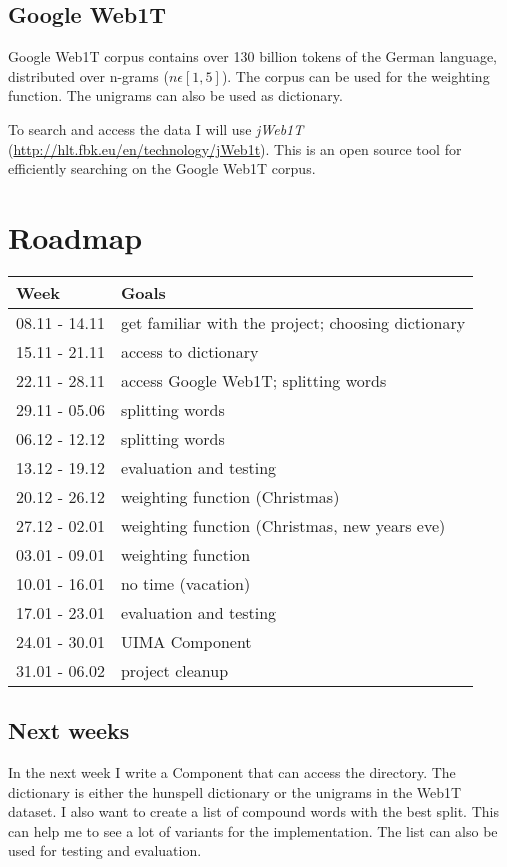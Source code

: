 \documentclass[11pt, accentcolor=tud9b, nochapname]{tudexercise}
\begin{document}
\subsection{Google Web1T}
Google Web1T corpus contains over 130 billion tokens of the German
language, distributed over n-grams ($n \epsilon [1,5]$). The corpus
can be used for the weighting function. The unigrams can also be used
as dictionary.

To search and access the data I will use \emph{jWeb1T}
(\url{http://hlt.fbk.eu/en/technology/jWeb1t}). This is an open source
  tool for efficiently searching on the Google Web1T corpus.

\section{Roadmap}

\begin{longtable}{|l|l|}
\hline
\textbf{Week} & \textbf{Goals} \\ \hline
08.11 - 14.11 & get familiar with the project; choosing dictionary \\ \hline
15.11 - 21.11 & access to dictionary \\ \hline
22.11 - 28.11 & access Google Web1T; splitting words \\ \hline
29.11 - 05.06 & splitting words \\ \hline
06.12 - 12.12 & splitting words \\ \hline
13.12 - 19.12 & evaluation and testing \\ \hline
20.12 - 26.12 & weighting function (Christmas) \\ \hline
27.12 - 02.01 & weighting function (Christmas, new years eve) \\ \hline
03.01 - 09.01 & weighting function \\ \hline
10.01 - 16.01 & no time (vacation) \\ \hline
17.01 - 23.01 & evaluation and testing \\ \hline
24.01 - 30.01 & UIMA Component \\ \hline
31.01 - 06.02 & project cleanup \\
\hline
\end{longtable}

\subsection{Next weeks}
In the next week I write a Component that can access the
directory. The dictionary is either the hunspell dictionary or the
unigrams in the Web1T dataset. I also want to create a list of
compound words with the best split. This can help me to see a lot of
variants for the implementation. The list can also be used for testing
and evaluation.




\end{document}
